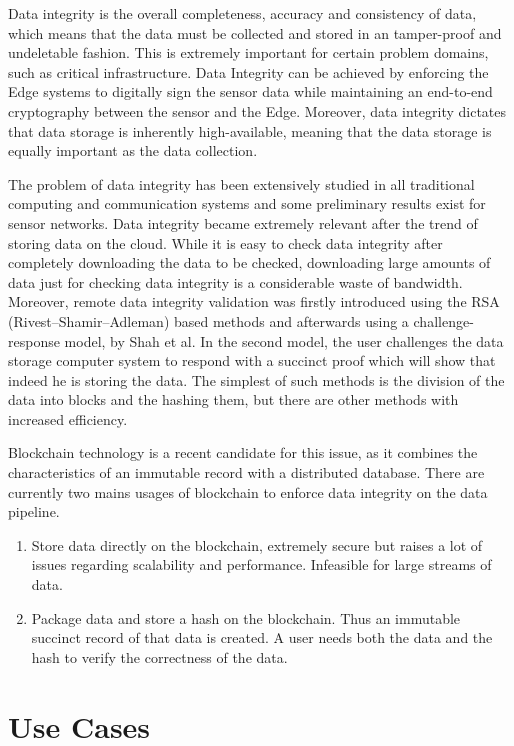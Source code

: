 Data integrity is the overall completeness, accuracy and consistency of data, which means that the data must be collected and stored in an tamper-proof and undeletable fashion. This is extremely important for certain problem domains, such as critical infrastructure. Data Integrity can be achieved by enforcing the Edge systems to digitally sign the sensor data while maintaining an end-to-end cryptography between the sensor and the Edge. Moreover, data integrity dictates that data storage is inherently high-available, meaning that the data storage is equally important as the data collection.

The problem of data integrity has been extensively studied in all traditional computing and communication systems and some preliminary results exist for sensor networks\cite{acharya2008data}. Data integrity became extremely relevant after the trend of storing data on the cloud. While it is easy to check data integrity after completely downloading the data to be checked, downloading large amounts of data just for checking data integrity is a considerable waste of bandwidth. Moreover, remote data integrity validation was firstly introduced using the RSA (Rivest–Shamir–Adleman) based methods and afterwards using a challenge-response model, by Shah et al\cite{shah2007auditing}. In the second model, the user challenges the data storage computer system to respond with a succinct proof which will show that indeed he is storing the data. The simplest of such methods is the division of the data into blocks and the hashing them, but there are other methods with increased efficiency\cite{kumar2011data}.

Blockchain technology is a recent candidate for this issue, as it combines the characteristics of an immutable record with a distributed database. There are currently two mains usages of blockchain to enforce data integrity on the data pipeline. 

\begin{enumerate}
    \item Store data directly on the blockchain, extremely secure but raises a lot of issues regarding scalability and performance. Infeasible for large streams of data.
    \item Package data and store a hash on the blockchain. Thus an immutable succinct record of that data is created. A user needs both the data and the hash to verify the correctness of the data.
\end{enumerate}

\section{Use Cases}

